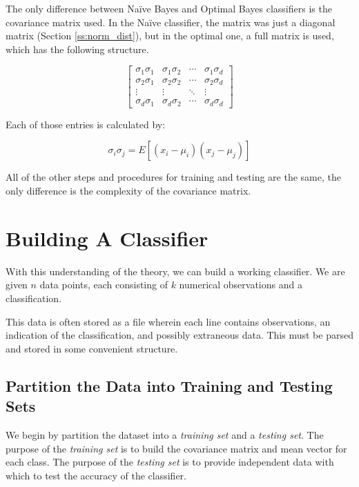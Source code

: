 \documentclass{article}
\begin{document}
The only difference between Na\"ive Bayes and Optimal Bayes classifiers
is the covariance matrix used.  In the Na\"ive classifier, the matrix
was just a diagonal matrix (Section \ref{ss:norm_dist}), but in the optimal one,
a full matrix is used, which has the following structure.

\begin{displaymath}
\begin{bmatrix} \sigma_1\sigma_1 & \sigma_1\sigma_2 & \cdots & \sigma_1\sigma_d \\
				 \sigma_2\sigma_1 & \sigma_2\sigma_2 & \cdots & \sigma_2\sigma_d \\
				 \vdots & \vdots & \ddots & \vdots \\
				 \sigma_d\sigma_1 & \sigma_d\sigma_2 & \cdots & \sigma_d\sigma_d
\end{bmatrix}
\end{displaymath}

Each of those entries is calculated by:

\begin{displaymath}
 \sigma_i\sigma_j = E [{(x_i - \mu_i)(x_j - \mu_j)}]
\end{displaymath}

All of the other steps and procedures for training and testing are the
same, the only difference is the complexity of the covariance matrix.


\section{Building A Classifier}
\label{sec:tutorial}

With this understanding of the theory, we can build a working
classifier.  We are given $n$ data points, each consisting of $k$
numerical observations and a classification.

This data is often stored as a file wherein each line contains
observations, an indication of the classification, and possibly
extraneous data.  This must be parsed and stored in some convenient
structure.

\subsection{Partition the Data into Training and Testing Sets}

We begin by partition the dataset into a \emph{training set} and a
\emph{testing set}.  The purpose of the \emph{training set} is to
build the covariance matrix and mean vector for each class.  The
purpose of the \emph{testing set} is to provide independent data with
which to test the accuracy of the classifier.
\end{document}
